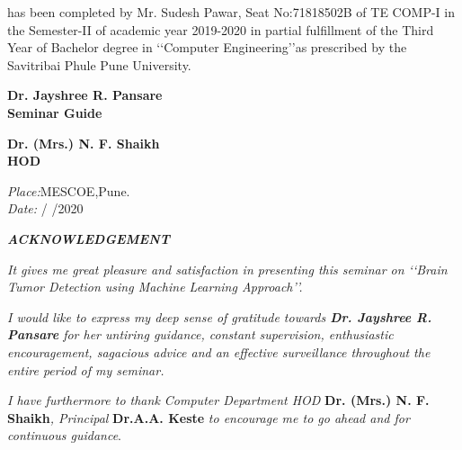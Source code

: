 \documentclass[a4paper, 12pt]{report}
\begin{document}
\begin{frontmatter}
\begin{titlepage}
\begin{center}
\end{center}  
has been completed by Mr. Sudesh Pawar, Seat No:71818502B of TE COMP-I in the Semester-II of academic year 2019-2020 in partial fulfillment of the Third Year of Bachelor degree in \lq\lq Computer Engineering\rq\rq as prescribed by the Savitribai Phule Pune University.
\vspace{3cm}
\begin{multicols}{2}
\begin{flushleft}
\textbf{Dr. Jayshree R. Pansare}\hspace{5cm}\\
\textbf{Seminar Guide}\\
\end{flushleft}
\begin{flushright}
\textbf{Dr. (Mrs.) N. F. Shaikh\\ { HOD}}\\
\end{flushright}
\end{multicols}\vspace{0.6cm}
\flushleft
\textit{Place:}MESCOE,Pune.\\
\textit{Date:}\hspace{0.4cm}   /\hspace{0.4cm}  /2020
\vfill
\end{titlepage}
\pagebreak
\renewcommand{\baselinestretch}{1.5}
\newpage
\begin{center}
{\Large{\bf{\textit{ACKNOWLEDGEMENT}}\\[2cm]}}
\end{center}
\par \textit{\quad \quad It gives me great pleasure and satisfaction in presenting this seminar on \lq\lq Brain Tumor Detection using Machine Learning Approach\rq\rq.}
\par \textit{\quad \quad I would like to express my deep sense of gratitude towards {\bf Dr. Jayshree R. Pansare} for her untiring guidance, constant supervision, enthusiastic encouragement, sagacious advice and an effective surveillance throughout the entire period of my seminar.}
\par \textit{\quad \quad I have furthermore to thank Computer Department HOD }{\bf Dr. (Mrs.) N. F. Shaikh}\textit{, \quad \quad Principal }{\bf Dr.A.A. Keste}  \textit{to encourage me to go ahead and for continuous guidance}.


\end{frontmatter}
\end{document}
